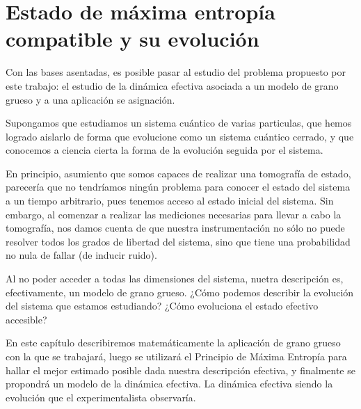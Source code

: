 \chapter{Estado de máxima entropía compatible y su evolución}



Con las bases asentadas, es posible pasar al estudio del problema propuesto por este trabajo: el estudio de la dinámica efectiva asociada a un modelo de grano grueso y a una aplicación se asignación.

Supongamos que estudiamos un sistema cuántico de varias particulas, que hemos logrado aislarlo de forma que evolucione como un sistema cuántico cerrado, y que conocemos a ciencia cierta la forma de la evolución seguida por el sistema.

En principio, asumiento que somos capaces de realizar una tomografía de estado, parecería que no tendríamos ningún problema para conocer el estado del sistema a un tiempo arbitrario, pues tenemos acceso al estado inicial del sistema. Sin embargo, al comenzar a realizar las mediciones necesarias para llevar a cabo la tomografía, nos damos cuenta de que nuestra instrumentación no sólo no puede resolver todos los grados de libertad del sistema, sino que tiene una probabilidad no nula de fallar (de inducir ruido).

Al no poder acceder a todas las dimensiones del sistema, nuetra descripción es, efectivamente, un modelo de grano grueso. ¿Cómo podemos describir la evolución del sistema que estamos estudiando? ¿Cómo evoluciona el estado efectivo accesible?

En este capítulo describiremos matemáticamente la aplicación de grano grueso con la que se trabajará, luego se utilizará el Principio de Máxima Entropía para hallar el mejor estimado posible dada nuestra descripción efectiva, y finalmente se propondrá un modelo de la dinámica efectiva. La dinámica efectiva siendo la evolución que el experimentalista observaría.






\newpage
